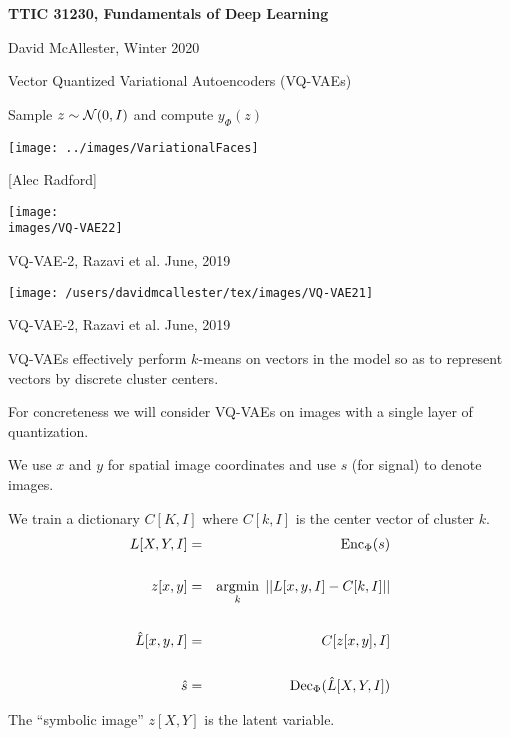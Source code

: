 





{\Huge

  \centerline{\bf TTIC 31230, Fundamentals of Deep Learning}
  \bigskip
  \centerline{David McAllester, Winter 2020}
  \vfill
  \vfil
  \centerline{Vector Quantized Variational Autoencoders (VQ-VAEs)}
  \vfill
  \vfill
  

\centerline{Sample {\color{red} $z \sim {\cal N}(0,I)$} and compute {\color{red} $y_\Phi(z)$}}

\vfill
\centerline{\texttt{[image: ../images/VariationalFaces]}}
\centerline{[Alec Radford]}


\centerline{\texttt{[image: \\images/VQ-VAE22]}}

\vfill
VQ-VAE-2, Razavi et al. June, 2019


\centerline{\texttt{[image: /users/davidmcallester/tex/images/VQ-VAE21]}}

\vfill
VQ-VAE-2, Razavi et al. June, 2019



VQ-VAEs effectively perform $k$-means on vectors in the model so as to represent vectors by discrete cluster centers.

\vfill
For concreteness we will consider VQ-VAEs on images with a single layer of quantization.

\vfill
We use $x$ and $y$ for spatial image coordinates and use $s$ (for signal) to denote images.


We train a dictionary $C[K,I]$ where $C[k,I]$ is the center vector of cluster $k$.
\begin{eqnarray*}
L[X,Y,I] & = & \mathrm{Enc}_\Phi(s) \\
\\
z[x,y] & = & \operatorname*{argmin}_k \;||L[x,y,I] - C[k,I]|| \\
\\
\hat{L}[x,y,I] & = & C[z[x,y],I] \\
\\
\hat{s} & = & \mathrm{Dec}_\Phi(\hat{L}[X,Y,I])
\end{eqnarray*}

\vfill
The ``symbolic image'' $z[X,Y]$ is the latent variable.

}
